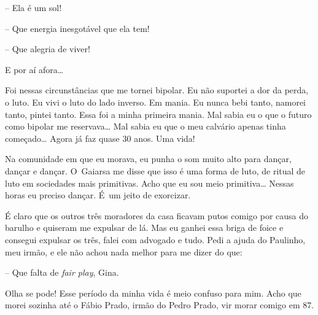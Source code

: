 -- Ela é um sol!

-- Que energia inesgotável que ela tem!

-- Que alegria de viver!

E por aí afora…

Foi nessas circunstâncias que me tornei bipolar. Eu não suportei a dor
da perda, o luto. Eu vivi o luto do lado inverso. Em mania. Eu nunca
bebi tanto, namorei tanto, pintei tanto. Essa foi a minha primeira
mania. Mal sabia eu o que o futuro como bipolar me reservava… Mal
sabia eu que o meu calvário apenas tinha começado… Agora já faz
quase 30 anos. Uma vida!

Na comunidade em que eu morava, eu punha o som muito alto para dançar,
dançar e dançar. O~Gaiarsa me disse que isso é uma forma de luto, de
ritual de luto em sociedades mais primitivas. Acho que eu sou meio
primitiva… Nessas horas eu preciso dançar. É~um jeito de
exorcizar.

É claro que os outros três moradores da casa ficavam putos comigo por
causa do barulho e quiseram me expulsar de lá. Mas eu ganhei essa briga
de foice e consegui expulsar os três, falei com advogado e tudo. Pedi a
ajuda do Paulinho, meu irmão, e ele não achou nada melhor para me dizer
do que:

-- Que falta de \emph{fair play}, Gina.

Olha se pode! Esse período da minha vida é meio confuso para mim. Acho que
morei sozinha até o Fábio Prado, irmão do Pedro Prado, vir morar comigo em 87.

